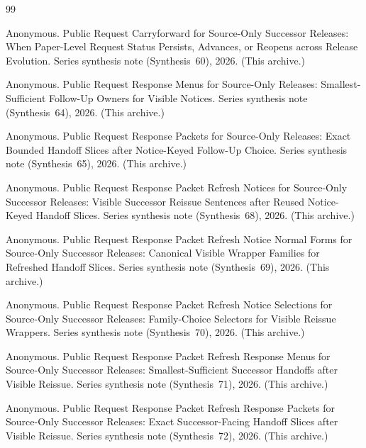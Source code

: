 \documentclass[11pt]{article}
\begin{document}
\begin{thebibliography}{99}\small

Anonymous.
\newblock Public Request Carryforward for Source-Only Successor Releases: When Paper-Level Request Status Persists, Advances, or Reopens across Release Evolution.
\newblock Series synthesis note (Synthesis~60), 2026. (This archive.)

Anonymous.
\newblock Public Request Response Menus for Source-Only Releases: Smallest-Sufficient Follow-Up Owners for Visible Notices.
\newblock Series synthesis note (Synthesis~64), 2026. (This archive.)

Anonymous.
\newblock Public Request Response Packets for Source-Only Releases: Exact Bounded Handoff Slices after Notice-Keyed Follow-Up Choice.
\newblock Series synthesis note (Synthesis~65), 2026. (This archive.)

Anonymous.
\newblock Public Request Response Packet Refresh Notices for Source-Only Successor Releases: Visible Successor Reissue Sentences after Reused Notice-Keyed Handoff Slices.
\newblock Series synthesis note (Synthesis~68), 2026. (This archive.)

Anonymous.
\newblock Public Request Response Packet Refresh Notice Normal Forms for Source-Only Successor Releases: Canonical Visible Wrapper Families for Refreshed Handoff Slices.
\newblock Series synthesis note (Synthesis~69), 2026. (This archive.)

Anonymous.
\newblock Public Request Response Packet Refresh Notice Selections for Source-Only Successor Releases: Family-Choice Selectors for Visible Reissue Wrappers.
\newblock Series synthesis note (Synthesis~70), 2026. (This archive.)

Anonymous.
\newblock Public Request Response Packet Refresh Response Menus for Source-Only Successor Releases: Smallest-Sufficient Successor Handoffs after Visible Reissue.
\newblock Series synthesis note (Synthesis~71), 2026. (This archive.)

Anonymous.
\newblock Public Request Response Packet Refresh Response Packets for Source-Only Successor Releases: Exact Successor-Facing Handoff Slices after Visible Reissue.
\newblock Series synthesis note (Synthesis~72), 2026. (This archive.)


\end{thebibliography}
\end{document}
